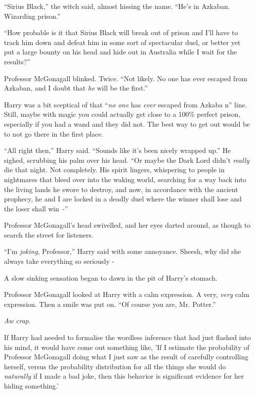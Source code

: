 ``Sirius Black,'' the witch said, almost hissing the name. ``He's in Azkaban. Wizarding prison.''

``How probable is it that Sirius Black will break out of prison and I'll have to track him down and defeat him in some sort of spectacular duel, or better yet put a large bounty on his head and hide out in Australia while I wait for the results?''

Professor McGonagall blinked. Twice. ``Not likely. No one has ever escaped from Azkaban, and I doubt that \emph{he} will be the first.''

Harry was a bit sceptical of that ``\emph{no one} has \emph{ever} escaped from Azkaba n'' line. Still, maybe with magic you could actually get close to a 100\% perfect prison, especially if you had a wand and they did not. The best way to get out would be to not go there in the first place.

``All right then,'' Harry said. ``Sounds like it's been nicely wrapped up.'' He sighed, scrubbing his palm over his head. ``Or maybe the Dark Lord didn't \emph{really} die that night. Not completely. His spirit lingers, whispering to people in nightmares that bleed over into the waking world, searching for a way back into the living lands he swore to destroy, and now, in accordance with the ancient prophecy, he and I are locked in a deadly duel where the winner shall lose and the loser shall win~-''

Professor McGonagall's head swivelled, and her eyes darted around, as though to search the street for listeners.

``I'm \emph{joking}, Professor,'' Harry said with some annoyance. Sheesh, why did she always take everything so seriously -

A slow sinking sensation began to dawn in the pit of Harry's stomach.

Professor McGonagall looked at Harry with a calm expression. A very, \emph{very} calm expression. Then a smile was put on. ``Of course you are, Mr. Potter.''

\emph{Aw crap.}

If Harry had needed to formalise the wordless inference that had just flashed into his mind, it would have come out something like, 'If I estimate the probability of Professor McGonagall doing what I just saw as the result of carefully controlling herself, versus the probability distribution for all the things she would do \emph{naturally} if I made a bad joke, then this behavior is significant evidence for her hiding something.'

